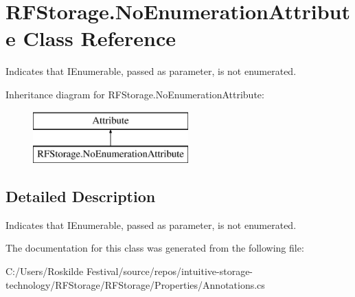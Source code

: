 \section{R\+F\+Storage.\+No\+Enumeration\+Attribute Class Reference}
\label{class_r_f_storage_1_1_no_enumeration_attribute}


Indicates that I\+Enumerable, passed as parameter, is not enumerated.  


Inheritance diagram for R\+F\+Storage.\+No\+Enumeration\+Attribute\+:\begin{figure}[H]
\begin{center}
\leavevmode
\includegraphics[height=2.000000cm]{class_r_f_storage_1_1_no_enumeration_attribute}
\end{center}
\end{figure}


\subsection{Detailed Description}
Indicates that I\+Enumerable, passed as parameter, is not enumerated. 



The documentation for this class was generated from the following file\+:\begin{DoxyCompactItemize}
\item 
C\+:/\+Users/\+Roskilde Festival/source/repos/intuitive-\/storage-\/technology/\+R\+F\+Storage/\+R\+F\+Storage/\+Properties/Annotations.\+cs\end{DoxyCompactItemize}
